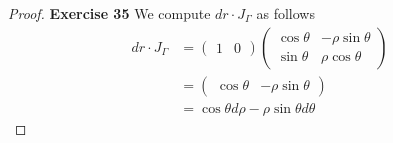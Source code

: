 \documentclass[11pt]{article}
\theoremstyle{definition}
\begin{document}
\begin{proof}{\textbf{Exercise 35}}
We compute $dr\cdot J_\Gamma$ as follows
\begin{align*}
    dr\cdot J_\Gamma &= \begin{pmatrix} 1 & 0 \end{pmatrix}
    \begin{pmatrix}
        \cos\theta & -\rho\sin\theta\\
        \sin\theta & \rho\cos\theta
    \end{pmatrix}\\
    &= \begin{pmatrix}
        \cos\theta & -\rho\sin\theta
    \end{pmatrix}\\
    &= \cos\theta d\rho -\rho\sin\theta d\theta
\end{align*}
\end{proof}
\end{document}
